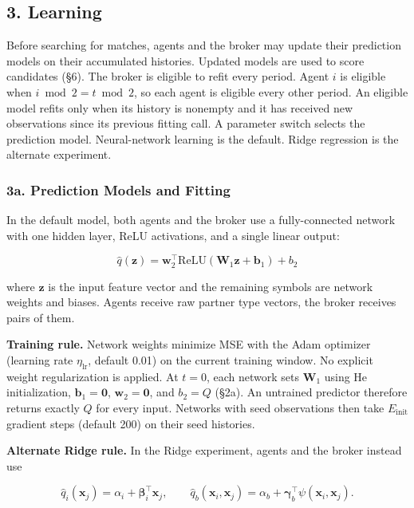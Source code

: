 \documentclass[11pt]{article}
\begin{document}
\subsection{3. Learning}\label{learning}

Before searching for matches, agents and the broker may update their prediction models on their accumulated histories. Updated models are used to score candidates (§6). The broker is eligible to refit every period. Agent \(i\) is eligible when \(i\bmod 2=t\bmod 2\), so each agent is eligible every other period. An eligible model refits only when its history is nonempty and it has received new observations since its previous fitting call. A parameter switch selects the prediction model. Neural-network learning is the default. Ridge regression is the alternate experiment.

\subsubsection{3a. Prediction Models and Fitting}\label{a.-architecture-and-fitting}

In the default model, both agents and the broker use a fully-connected network with one hidden layer, ReLU activations, and a single linear output:

\[\hat{q}(\mathbf{z}) = \mathbf{w}_2^\top \text{ReLU}(\mathbf{W}_1 \mathbf{z} + \mathbf{b}_1) + b_2\]

where \(\mathbf{z}\) is the input feature vector and the remaining symbols are network weights and biases. Agents receive raw partner type vectors, the broker receives pairs of them.

\textbf{Training rule.} Network weights minimize MSE with the Adam optimizer (learning rate \(\eta_{\mathrm{lr}}\), default 0.01) on the current training window. No explicit weight regularization is applied. At \(t = 0\), each network sets \(\mathbf W_1\) using He initialization, \(\mathbf b_1=\mathbf 0\), \(\mathbf w_2=\mathbf 0\), and \(b_2=Q\) (§2a). An untrained predictor therefore returns exactly \(Q\) for every input. Networks with seed observations then take \(E_{\text{init}}\) gradient steps (default 200) on their seed histories.

\textbf{Alternate Ridge rule.} In the Ridge experiment, agents and the broker instead use

\[
\hat q_i(\mathbf x_j)=\alpha_i+\boldsymbol\beta_i^\top\mathbf x_j,
\qquad
\hat q_b(\mathbf x_i,\mathbf x_j)=\alpha_b+\boldsymbol\gamma_b^\top\psi(\mathbf x_i,\mathbf x_j).
\]
\end{document}
